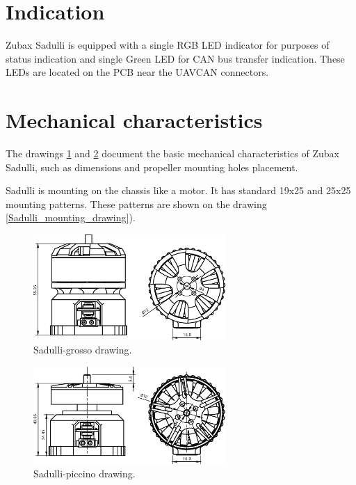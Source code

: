 \documentclass{zubaxdoc}
\begin{document}
\section{Indication}

Zubax Sadulli is equipped with a single RGB LED indicator for purposes of status indication and single Green LED for 
CAN bus transfer indication. These LEDs are located on the PCB near the UAVCAN connectors.

\section{Mechanical characteristics}

The drawings \ref{Sadulli_grosso_drawing} and \ref{Sadulli_piccino_drawing} document the basic mechanical 
characteristics of Zubax Sadulli, such as dimensions and propeller mounting holes placement.

Sadulli is mounting on the chassis like a motor. It has standard  19x25 and 25x25 mounting patterns. These patterns are
shown on the drawing \ref{Sadulli_mounting_drawing}).

\begin{figure}[tb]
    \centering    
    \includegraphics[width=0.65\textwidth]{sadulli-grosso_drawing}
    \caption{Sadulli-grosso drawing.\label{Sadulli_grosso_drawing}} 
\end{figure}

\begin{figure}[b]
    \centering    
    \includegraphics[width=0.65\textwidth]{sadulli-piccino_drawing}
    \caption{Sadulli-piccino drawing.\label{Sadulli_piccino_drawing}}
\end{figure}
\end{document}
